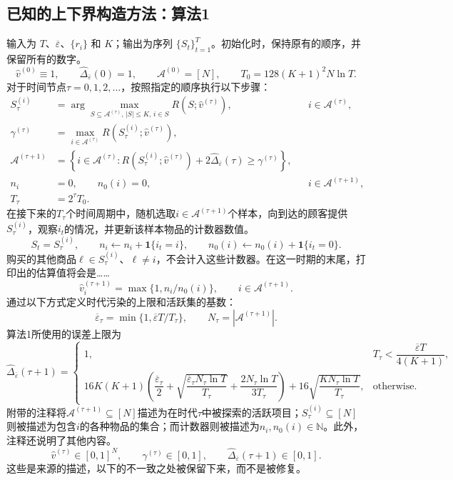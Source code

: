 \documentclass{article}
\begin{document}
\subsection*{已知的上下界构造方法：算法1}
输入为 $T$、$\overline\varepsilon$、$\{r_i\}$ 和 $K$；输出为序列 $\{S_t\}_{t=1}^{T}$。初始化时，保持原有的顺序，并保留所有的数字。
\[
\widehat v^{(0)}\equiv1,\qquad
\widehat\Delta_{\overline\varepsilon}(0)=1,\qquad
\mathcal A^{(0)}=[N],\qquad
T_0=128(K+1)^2N\ln T.
\]
对于时间节点$\tau=0,1,2,\ldots$，按照指定的顺序执行以下步骤：
\[
\begin{aligned}
S_\tau^{(i)}
&=\arg\max_{S\subseteq\mathcal A^{(\tau)},\,|S|\le K,\,i\in S}
 R(S;\widehat v^{(\tau)}),
&&i\in\mathcal A^{(\tau)},\\
\gamma^{(\tau)}
&=\max_{i\in\mathcal A^{(\tau)}}R(S_\tau^{(i)};\widehat v^{(\tau)}),\\
\mathcal A^{(\tau+1)}
&=\left\{i\in\mathcal A^{(\tau)}:
R(S_\tau^{(i)};\widehat v^{(\tau)})
+2\widehat\Delta_{\overline\varepsilon}(\tau)\ge\gamma^{(\tau)}\right\},\\
n_i&=0,\qquad n_0(i)=0,
&&i\in\mathcal A^{(\tau+1)},\\
T_\tau&=2^\tau T_0.
\end{aligned}
\]
在接下来的$T_\tau$个时间周期中，随机选取$i\in\mathcal A^{(\tau+1)}$个样本，向到达的顾客提供$S_\tau^{(i)}$，观察$i_t$的情况，并更新该样本物品的计数器数值。
\[
S_t=S_\tau^{(i)},\qquad
n_i\leftarrow n_i+\mathbf1\{i_t=i\},\qquad
n_0(i)\leftarrow n_0(i)+\mathbf1\{i_t=0\}.
\]
购买的其他商品$\ell\in S_\tau^{(i)}$、$\ell\ne i$，不会计入这些计数器。在这一时期的末尾，打印出的估算值将会是……
\[
\widehat v_i^{(\tau+1)}
=\max\{1,n_i/n_0(i)\},\qquad i\in\mathcal A^{(\tau+1)}.
\]
通过以下方式定义时代污染的上限和活跃集的基数：
\[
\overline\varepsilon_\tau
=\min\{1,\overline\varepsilon T/T_\tau\},\qquad
N_\tau=|\mathcal A^{(\tau+1)}|.
\]
算法1所使用的误差上限为
\[
\widehat\Delta_{\overline\varepsilon}(\tau+1)
=\begin{cases}
1,&T_\tau<\dfrac{\overline\varepsilon T}{4(K+1)},\\[6pt]
16K(K+1)\left(
\dfrac{\overline\varepsilon_\tau}{2}
+\sqrt{\dfrac{\overline\varepsilon_\tau N_\tau\ln T}{T_\tau}}
+\dfrac{2N_\tau\ln T}{3T_\tau}
\right)
+16\sqrt{\dfrac{KN_\tau\ln T}{T_\tau}},&\text{otherwise}.
\end{cases}
\]
附带的注释将$\mathcal A^{(\tau+1)}\subseteq[N]$描述为在时代$\tau$中被探索的活跃项目；$S_\tau^{(i)}\subseteq[N]$则被描述为包含$i$的各种物品的集合；而计数器则被描述为$n_i,n_0(i)\in\mathbb N$。此外，注释还说明了其他内容。
\[
\widehat v^{(\tau)}\in[0,1]^N,\qquad
\gamma^{(\tau)}\in[0,1],\qquad
\widehat\Delta_{\overline\varepsilon}(\tau+1)\in[0,1].
\]
这些是来源的描述，以下的不一致之处被保留下来，而不是被修复。
\end{document}
